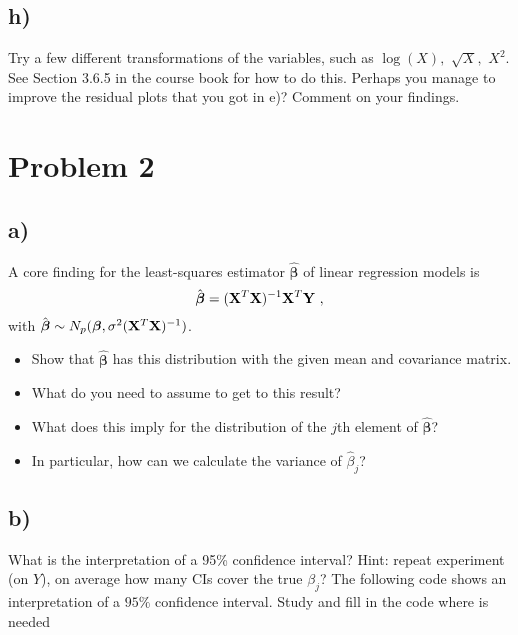 \documentclass[
]{article}
\providecommand{\tightlist}{%
  \setlength{\itemsep}{0pt}\setlength{\parskip}{0pt}}
\begin{document}
\hypertarget{h}{%
\subsection{h)}\label{h}}

Try a few different transformations of the variables, such as
\(\log(X),\) \(\sqrt{X},\) \(X^2\). See Section 3.6.5 in the course book
for how to do this. Perhaps you manage to improve the residual plots
that you got in e)? Comment on your findings.

\hypertarget{problem-2}{%
\section{Problem 2}\label{problem-2}}

\hypertarget{a-1}{%
\subsection{a)}\label{a-1}}

A core finding for the least-squares estimator
\(\hat{\boldsymbol\beta}\) of linear regression models is
\[ \hat{\boldsymbol\beta} = ({\bf X}^T{\bf X})^{-1} {\bf X}^T {\bf Y} \ , \]
with
\(\hat{\boldsymbol\beta}\sim N_{p}(\boldsymbol\beta,\sigma^2({\bf X}^T{\bf X})^{-1})\).

\begin{itemize}
\tightlist
\item
  Show that \(\hat{\boldsymbol\beta}\) has this distribution with the
  given mean and covariance matrix.
\item
  What do you need to assume to get to this result?
\item
  What does this imply for the distribution of the \(j\)th element of
  \(\hat{\boldsymbol\beta}\)?
\item
  In particular, how can we calculate the variance of \(\hat{\beta}_j\)?
\end{itemize}

\hypertarget{b-1}{%
\subsection{b)}\label{b-1}}

What is the interpretation of a 95\% confidence interval? Hint: repeat
experiment (on \(Y\)), on average how many CIs cover the true
\(\beta_j\)? The following code shows an interpretation of a \(95\%\)
confidence interval. Study and fill in the code where is needed
\end{document}
